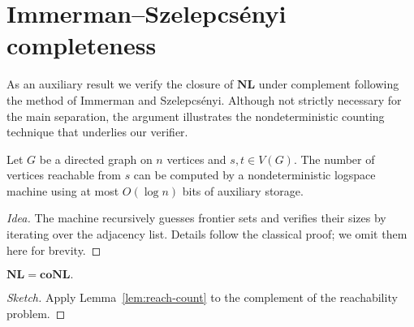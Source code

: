 \section{Immerman--Szelepcsényi completeness}\label{P:immerman}

As an auxiliary result we verify the closure of \(\mathbf{NL}\) under
complement following the method of Immerman and Szelepcsényi.  Although not
strictly necessary for the main separation, the argument illustrates the
nondeterministic counting technique that underlies our verifier.

\begin{lemma}\label{lem:reach-count}
Let \(G\) be a directed graph on \(n\) vertices and \(s,t\in V(G)\).  The
number of vertices reachable from \(s\) can be computed by a nondeterministic
logspace machine using at most \(O(\log n)\) bits of auxiliary storage.
\end{lemma}

\begin{proof}[Idea]
The machine recursively guesses frontier sets and verifies their sizes by
iterating over the adjacency list.  Details follow the classical proof; we
omit them here for brevity.
\end{proof}

\begin{theorem}
\(\mathbf{NL}=\mathbf{coNL}.\)
\end{theorem}

\begin{proof}[Sketch]
Apply Lemma~\ref{lem:reach-count} to the complement of the reachability
problem.  \qedhere
\end{proof} 